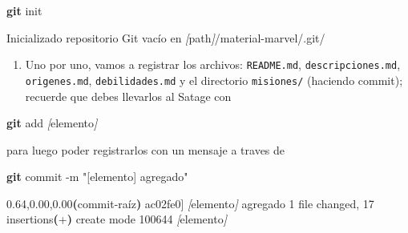 \documentclass[
]{book}
\newenvironment{Shaded}{\begin{snugshade}}{\end{snugshade}}
\newcommand{\AttributeTok}[1]{\textcolor[rgb]{0.13,0.29,0.53}{#1}}
\newcommand{\ErrorTok}[1]{\textcolor[rgb]{0.64,0.00,0.00}{\textbf{#1}}}
\newcommand{\ExtensionTok}[1]{#1}
\newcommand{\FunctionTok}[1]{\textcolor[rgb]{0.13,0.29,0.53}{\textbf{#1}}}
\newcommand{\KeywordTok}[1]{\textcolor[rgb]{0.13,0.29,0.53}{\textbf{#1}}}
\newcommand{\NormalTok}[1]{#1}
\newcommand{\PreprocessorTok}[1]{\textcolor[rgb]{0.56,0.35,0.01}{\textit{#1}}}
\newcommand{\SpecialStringTok}[1]{\textcolor[rgb]{0.31,0.60,0.02}{#1}}
\newcommand{\StringTok}[1]{\textcolor[rgb]{0.31,0.60,0.02}{#1}}
\providecommand{\tightlist}{%
  \setlength{\itemsep}{0pt}\setlength{\parskip}{0pt}}
\begin{document}
\begin{Shaded}
\begin{Highlighting}[]
\FunctionTok{git}\NormalTok{ init}
\end{Highlighting}
\end{Shaded}

\begin{Shaded}
\begin{Highlighting}[]
\ExtensionTok{Inicializado}\NormalTok{ repositorio Git vacío en }\PreprocessorTok{[}\SpecialStringTok{path}\PreprocessorTok{]}\NormalTok{/material{-}marvel/.git/}
\end{Highlighting}
\end{Shaded}

\begin{enumerate}
\def\labelenumi{\arabic{enumi}.}
\setcounter{enumi}{1}
\tightlist
\item
  Uno por uno, vamos a registrar los archivos: \texttt{README.md}, \texttt{descripciones.md}, \texttt{origenes.md}, \texttt{debilidades.md} y el directorio \texttt{misiones/} (haciendo commit); recuerde que debes llevarlos al Satage con
\end{enumerate}

\begin{Shaded}
\begin{Highlighting}[]
\FunctionTok{git}\NormalTok{ add }\PreprocessorTok{[}\SpecialStringTok{elemento}\PreprocessorTok{]}
\end{Highlighting}
\end{Shaded}

para luego poder registrarlos con un mensaje a traves de

\begin{Shaded}
\begin{Highlighting}[]
\FunctionTok{git}\NormalTok{ commit }\AttributeTok{{-}m} \StringTok{"[elemento] agregado"}
\end{Highlighting}
\end{Shaded}

\begin{Shaded}
\begin{Highlighting}[]
\ExtensionTok{[main} \ErrorTok{(}\ExtensionTok{commit{-}raíz}\KeywordTok{)} \ExtensionTok{ac02fe0]} \PreprocessorTok{[}\SpecialStringTok{elemento}\PreprocessorTok{]}\NormalTok{ agregado}
 \ExtensionTok{1}\NormalTok{ file changed, 17 insertions}\ErrorTok{(}\ExtensionTok{+}\KeywordTok{)}
 \ExtensionTok{create}\NormalTok{ mode 100644 }\PreprocessorTok{[}\SpecialStringTok{elemento}\PreprocessorTok{]}
\end{Highlighting}
\end{Shaded}
\end{document}
